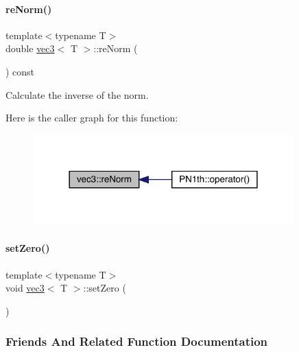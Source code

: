 \paragraph{\texorpdfstring{re\+Norm()}{reNorm()}}
{\footnotesize\ttfamily template$<$typename T$>$ \\
double \mbox{\hyperlink{structvec3}{vec3}}$<$ T $>$\+::re\+Norm (\begin{DoxyParamCaption}{ }\end{DoxyParamCaption}) const\hspace{0.3cm}{\ttfamily [inline]}}



Calculate the inverse of the norm. 

Here is the caller graph for this function\+:\nopagebreak
\begin{figure}[H]
\begin{center}
\leavevmode
\includegraphics[width=285pt]{structvec3_afd43645a0cc5c449ae4b98f6d93774d2_icgraph}
\end{center}
\end{figure}
\mbox{\label{structvec3_a4bfe30989d83b8f3b5b3d2177f804360}} 
\paragraph{\texorpdfstring{set\+Zero()}{setZero()}}
{\footnotesize\ttfamily template$<$typename T$>$ \\
void \mbox{\hyperlink{structvec3}{vec3}}$<$ T $>$\+::set\+Zero (\begin{DoxyParamCaption}{ }\end{DoxyParamCaption})\hspace{0.3cm}{\ttfamily [inline]}}



\subsubsection{Friends And Related Function Documentation}
\mbox{\label{structvec3_a8e5a34109d722a0e43d027e496eebc98}} 
